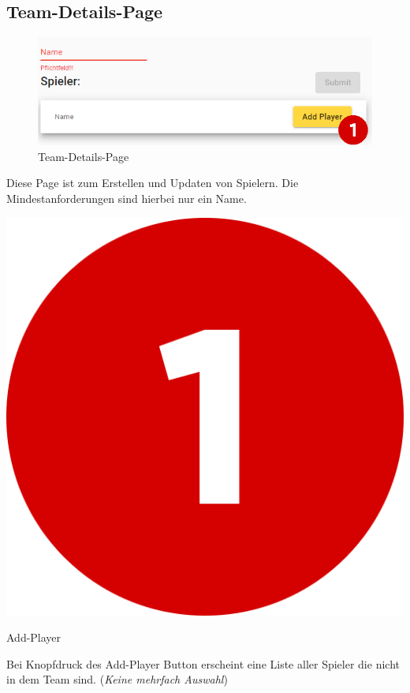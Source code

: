 \subsection{Team-Details-Page}
\begin{figure}[H]
    \includegraphics[scale=0.5]{pics/user-guide/team-create-page.PNG}
    \caption{Team-Details-Page}
\end{figure}
Diese Page ist zum Erstellen und Updaten von Spielern. Die Mindestanforderungen sind hierbei nur ein Name.

\bigskip
\includegraphics[scale=0.05]{pics/user-guide/numbers/number-1.png} \begin{LARGE} Add-Player \end{LARGE}

Bei Knopfdruck des Add-Player Button erscheint eine Liste aller Spieler die nicht in dem Team sind.
(\textit{Keine mehrfach Auswahl}) 

